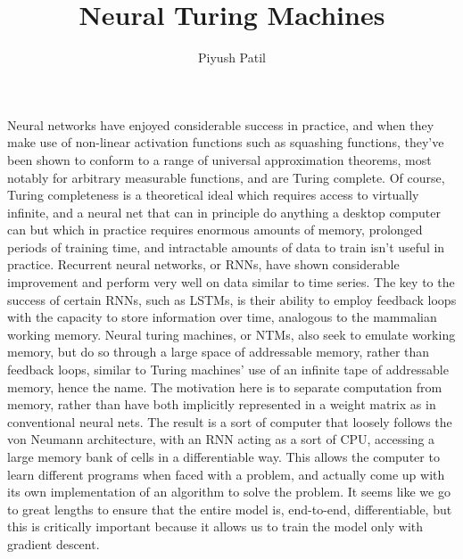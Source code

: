 \documentclass{article}
\begin{document}
\title{Neural Turing Machines}
\author{Piyush Patil}
\maketitle

Neural networks have enjoyed considerable success in practice, and when they make use of non-linear activation functions such as squashing functions, they've been shown to conform to a range of universal approximation theorems, most notably for arbitrary measurable functions, and are Turing complete. Of course, Turing completeness is a theoretical ideal which requires access to virtually infinite, and a neural net that can in principle do anything a desktop computer can but which in practice requires enormous amounts of memory, prolonged periods of training time, and intractable amounts of data to train isn't useful in practice. Recurrent neural networks, or RNNs, have shown considerable improvement and perform very well on data similar to time series. The key to the success of certain RNNs, such as LSTMs, is their ability to employ feedback loops with the capacity to store information over time, analogous to the mammalian working memory. Neural turing machines, or NTMs, also seek to emulate working memory, but do so through a large space of addressable memory, rather than feedback loops, similar to Turing machines' use of an infinite tape of addressable memory, hence the name.
The motivation here is to separate computation from memory, rather than have both implicitly represented in a weight matrix as in conventional neural nets. The result is a sort of computer that loosely follows the von Neumann architecture, with an RNN acting as a sort of CPU, accessing a large memory bank of cells in a differentiable way. This allows the computer to learn different programs when faced with a problem, and actually come up with its own implementation of an algorithm to solve the problem. It seems like we go to great lengths to ensure that the entire model is, end-to-end, differentiable, but this is critically important because it allows us to train the model only with gradient descent. 
\end{document}
